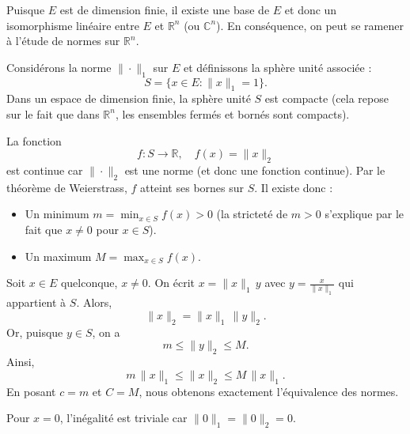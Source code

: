 \begin{preuve}

   Puisque \( E \) est de dimension finie, il existe une base de \( E \) et donc un isomorphisme linéaire entre \( E \) et \(\mathbb{R}^n\) (ou \(\mathbb{C}^n\)). En conséquence, on peut se ramener à l'étude de normes sur \(\mathbb{R}^n\).


   Considérons la norme \(\|\cdot\|_1\) sur \( E \) et définissons la sphère unité associée :
   \[
   S = \{ x \in E : \|x\|_1 = 1 \}.
   \]
   Dans un espace de dimension finie, la sphère unité \( S \) est compacte (cela repose sur le fait que dans \(\mathbb{R}^n\), les ensembles fermés et bornés sont compacts).


   La fonction
   \[
   f : S \to \mathbb{R}, \quad f(x) = \|x\|_2
   \]
   est continue car \(\|\cdot\|_2\) est une norme (et donc une fonction continue). Par le théorème de Weierstrass, \( f \) atteint ses bornes sur \( S \). Il existe donc :
   \begin{itemize}
       \item Un minimum \( m = \min_{x \in S} f(x) > 0 \) (la stricteté de \( m > 0 \) s’explique par le fait que \( x \neq 0 \) pour \( x \in S \)).
       \item Un maximum \( M = \max_{x \in S} f(x) \).
   \end{itemize}


   Soit \( x \in E \) quelconque, \( x \neq 0 \). On écrit \( x = \|x\|_1 \, y \) avec \( y = \frac{x}{\|x\|_1} \) qui appartient à \( S \). Alors,
   \[
   \|x\|_2 = \|x\|_1\,\|y\|_2.
   \]
   Or, puisque \( y \in S \), on a
   \[
   m \le \|y\|_2 \le M.
   \]
   Ainsi,
   \[
   m\,\|x\|_1 \le \|x\|_2 \le M\,\|x\|_1.
   \]
   En posant \( c = m \) et \( C = M \), nous obtenons exactement l'équivalence des normes.


   Pour \( x = 0 \), l'inégalité est triviale car \( \|0\|_1 = \|0\|_2 = 0 \).


\end{preuve}

